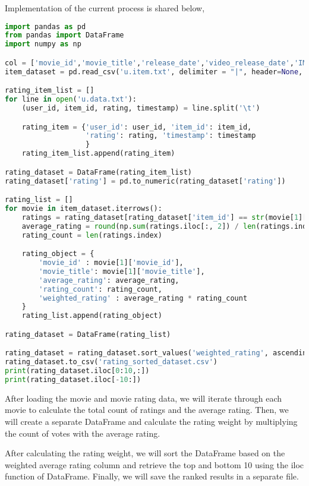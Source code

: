 \documentclass[12pt]{article}
\begin{document}
Implementation of the current process is shared below, 
\begin{lstlisting}[language=Python, caption=Ranking the movies] 
import pandas as pd
from pandas import DataFrame
import numpy as np

col = ['movie_id','movie_title','release_date','video_release_date','IMDb_URL','unknown','Action','Adventure','Animation','Childrens','Comedy','Crime','Documentary','Drama','Fantasy','Film_Noir','Horror','Musical','Mystery','Romance','Sci_Fi','Thriller','War','Western']
item_dataset = pd.read_csv('u.item.txt', delimiter = "|", header=None, names=col)

rating_item_list = []
for line in open('u.data.txt'):
    (user_id, item_id, rating, timestamp) = line.split('\t')

    rating_item = {'user_id': user_id, 'item_id': item_id,
                   'rating': rating, 'timestamp': timestamp
                   }
    rating_item_list.append(rating_item)

rating_dataset = DataFrame(rating_item_list)
rating_dataset['rating'] = pd.to_numeric(rating_dataset['rating'])

rating_list = []
for movie in item_dataset.iterrows():
    ratings = rating_dataset[rating_dataset['item_id'] == str(movie[1]['movie_id'])]
    average_rating = round(np.sum(ratings.iloc[:, 2]) / len(ratings.index), 2)
    rating_count = len(ratings.index)

    rating_object = { 
        'movie_id' : movie[1]['movie_id'], 
        'movie_title': movie[1]['movie_title'],
        'average_rating': average_rating,
        'rating_count': rating_count,
        'weighted_rating' : average_rating * rating_count
    }
    rating_list.append(rating_object)

rating_dataset = DataFrame(rating_list)

rating_dataset = rating_dataset.sort_values('weighted_rating', ascending=False)
rating_dataset.to_csv('rating_sorted_dataset.csv')
print(rating_dataset.iloc[0:10,:])
print(rating_dataset.iloc[-10:])


\end{lstlisting}

After loading the movie and movie rating data, we will iterate through each movie to calculate the total count of ratings and the average rating. Then, we will create a separate DataFrame and calculate the rating weight by multiplying the count of votes with the average rating.

After calculating the rating weight, we will sort the DataFrame based on the weighted average rating column and retrieve the top and bottom 10 using the iloc function of DataFrame. Finally, we will save the ranked results in a separate file.
\end{document}
